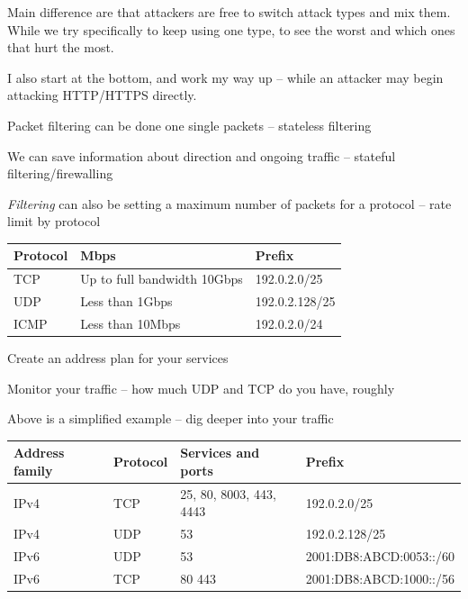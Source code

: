 \documentclass[Screen16to9,17pt]{foils}
\begin{document}
Main difference are that attackers are free to switch attack types and mix them. While we try specifically to keep using one type, to see the worst and which ones that hurt the most.

I also start at the bottom, and work my way up -- while an attacker may begin attacking HTTP/HTTPS directly.



\begin{list2}
\item Packet filtering can be done one single packets -- stateless filtering
\item We can save information about direction and ongoing traffic -- stateful filtering/firewalling
\item \emph{Filtering} can also be setting a maximum number of packets for a protocol -- rate limit by protocol
\end{list2}



\begin{tabularx}{\textwidth-5cm}{|p{5cm}|p{7cm}|X|} \hline
{\bf Protocol} & {\bf Mbps} & {\bf Prefix}\\\hline
TCP & Up to full bandwidth 10Gbps & 192.0.2.0/25 \\\hline
UDP & Less than 1Gbps & 192.0.2.128/25 \\\hline
ICMP & Less than 10Mbps & 192.0.2.0/24 \\\hline
\end{tabularx}


\begin{list2}
\item Create an address plan for your services
\item Monitor your traffic -- how much UDP and TCP do you have, roughly

\item Above is a simplified example -- dig deeper into your traffic
\end{list2}


\begin{tabularx}{\textwidth-5cm}{|p{2cm}|p{2cm}|p{7cm}|X|} \hline
{\bf Address family} & {\bf Protocol} & {\bf Services and ports} & {\bf Prefix}\\\hline
IPv4 & TCP & 25, 80, 8003, 443, 4443 & 192.0.2.0/25 \\\hline
IPv4 & UDP & 53 & 192.0.2.128/25 \\\hline
IPv6 & UDP & 53  & 2001:DB8:ABCD:0053::/60 \\\hline
IPv6 & TCP & 80 443 & 2001:DB8:ABCD:1000::/56 \\\hline
\end{tabularx}
\end{document}
